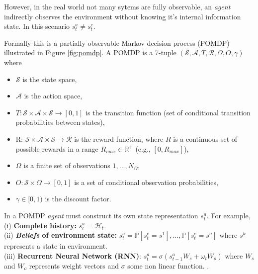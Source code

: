 \vspace{3mm}

However, in the real world not many sytems are fully observable, an {\em agent} indirectly observes the environment without knowing it's internal information state. In this scenario $s_t^a \neq s^e_t$.



Formally this is a partially observable Markov decision process (POMDP) illustrated in Figure \ref{fig:pomdp}.
\vspace{5mm}
A POMDP is a 7-tuple $(\mathcal{S}, \mathcal{A}, T, \mathcal{R}, \Omega, O, \gamma)$ where
\begin{itemize}
  \item[] $\mathcal{S}$ is the state space,
  \item[] $\mathcal{A}$ is the action space,
  \item[] $T : \mathcal{S} \times \mathcal{A}\times \mathcal{S} \rightarrow [0, 1]$ is the transition function (set of conditional
  transition probabilities between states),
  \item[] R: $\mathcal{S} \times \mathcal{A}\times \mathcal{S} \rightarrow \mathcal{R}$ is the reward function, where $R$ is a continuous set of possible rewards in a range $R_{max} \in \mathbb{R}^+$ (e.g., $[0, R_{max}]$),
  \item[] $\Omega$ is a finite set of observations ${1, . . . , N_{\Omega}}$,
  \item[] $O : \mathcal{S} \times \Omega \rightarrow [0, 1]$ is a set of conditional observation probabilities,
  \item[] $\gamma \in  [0, 1)$ is the discount factor.
\end{itemize}


In a POMDP {\em agent} must construct its own state representation $s_t^a$. For example,\\
(i) \textbf{Complete history:} $s_t^a = \mathcal{H}_t$.\\
(ii) \textbf{{\em Beliefs} of environment state:} $s_t^a = \mathbb{P}[s_t^e = s^1],\ldots,\mathbb{P}[s_t^e = s^n]$ where $s^k$ represents a state in environment.\\
(iii) \textbf{Recurrent Neural Network (RNN)}: $s_t^a = \sigma(s_{t-1}^a W_s + \omega_t W_o)$ where $W_s$ and $W_o$ represents weight vectors and $\sigma$ some non linear function. \cite{wierstra2010recurrent, hausknecht2015deep, heess2015memory}.

